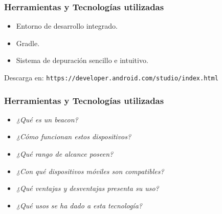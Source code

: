 \begin{frame}
	\frametitle{Herramientas y Tecnologías utilizadas}
		\begin{itemize}
			\item Entorno de desarrollo integrado.
			\item Gradle.
			\item Sistema de depuración sencillo e intuitivo.
		\end{itemize}
		Descarga en: \texttt{https://developer.android.com/studio/index.html}
	\endblock{}
\end{frame}

\begin{frame}
	\frametitle{Herramientas y Tecnologías utilizadas}
		\begin{itemize}
			\item {\it ¿Qué es un beacon?}
			\item {\it ¿Cómo funcionan estos dispositivos?}
			\item {\it ¿Qué rango de alcance poseen?}
			\item {\it ¿Con qué dispositivos móviles son compatibles?}
			\item {\it ¿Qué ventajas y desventajas presenta su uso?}
			\item {\it ¿Qué usos se ha dado a esta tecnología?}
		\end{itemize}
	\endblock{}
\end{frame}


